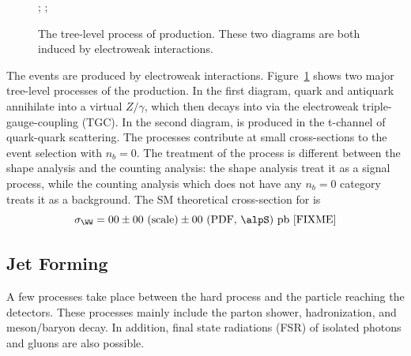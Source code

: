 \begin{figure}[ht]
    \centering
    ; \qquad
    ;
    \caption{The tree-level process of \WW production. These two diagrams are both induced by electroweak interactions. }
    \label{fig:physics:ppCollision:ww}
\end{figure}
\noindent The \WW events are produced by electroweak interactions. Figure~\ref{fig:physics:ppCollision:ww} shows two major tree-level processes of the \WW production. In the first diagram, quark and antiquark annihilate into a virtual $Z/\gamma$, which then decays into \WW via the electroweak triple-gauge-coupling (TGC). In the second diagram, \WW is produced in the t-channel of quark-quark scattering. The \WW processes contribute at small cross-sections to the event selection with $n_b=0$. The treatment of the \WW process is different between the shape analysis and the counting analysis: the shape analysis treat it as a signal process, while the counting analysis which does not have any $n_b=0$ category treats it as a background. The SM theoretical cross-section for \WW is 
\begin{equation}
    \sigma_{\WW} = 00 \pm 00  \text{~(scale)}  \pm 00  \text{~(PDF, \alpS)~pb [FIXME]}
\end{equation}




\subsection{Jet Forming}
\label{sec:physics:ppCollision:jetForming} 

A few processes take place between the hard process and the particle reaching the detectors. These processes mainly include the parton shower, hadronization, and meson/baryon decay. In addition, final state radiations (FSR) of isolated photons and gluons are also possible.


